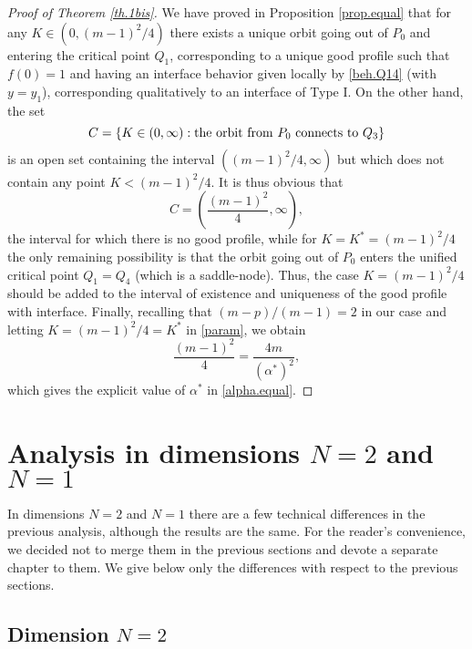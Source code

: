 \documentclass[a4paper,11pt]{article}
\numberwithin{equation}{section}
\begin{document}
\begin{proof}[Proof of Theorem \ref{th.1bis}]
We have proved in Proposition \ref{prop.equal} that for any $K\in(0,(m-1)^2/4)$ there exists a unique orbit going out of $P_0$ and entering the critical point $Q_1$, corresponding to a unique good profile such that $f(0)=1$ and having an interface behavior given locally by \eqref{beh.Q14} (with $y=y_1$), corresponding qualitatively to an interface of Type I. On the other hand, the set
$$
C=\{K\in(0,\infty):{\rm the \ orbit \ from} \ P_0 \ {\rm connects \ to} \ Q_3\}
$$
is an open set containing the interval $((m-1)^2/4,\infty)$ but which does not contain any point $K<(m-1)^2/4$. It is thus obvious that
$$
C=\left(\frac{(m-1)^2}{4},\infty\right),
$$
the interval for which there is no good profile, while for $K=K^*=(m-1)^2/4$ the only remaining possibility is that the orbit going out of $P_0$ enters the unified critical point $Q_1=Q_4$ (which is a saddle-node). Thus, the case $K=(m-1)^2/4$ should be added to the interval of existence and uniqueness of the good profile with interface. Finally, recalling that $(m-p)/(m-1)=2$ in our case and letting $K=(m-1)^2/4=K^*$ in \eqref{param}, we obtain
$$
\frac{(m-1)^2}{4}=\frac{4m}{(\alpha^*)^2},
$$
which gives the explicit value of $\alpha^*$ in \eqref{alpha.equal}.
\end{proof}

\section{Analysis in dimensions $N=2$ and $N=1$}\label{sec.lowdim}

In dimensions $N=2$ and $N=1$ there are a few technical differences in the previous analysis, although the results are the same. For the reader's convenience, we decided not to merge them in the previous sections and devote a separate chapter to them. We give below only the differences with respect to the previous sections.

\subsection{Dimension $N=2$}\label{subsec.N2}
\end{document}
